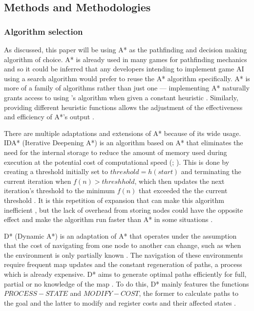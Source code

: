 \documentclass[11pt, a4paper]{article}
\begin{document}
\subsection{Methods and Methodologies}
\label{subsec:methodsAndMethodologies}

\subsubsection{Algorithm selection}
\label{subsubsec:algorithmSelection}

As discussed, this paper will be using A* as the pathfinding and decision making algorithm of choice. A* is already used in many games for pathfinding mechanics \parencite[197]{millington2019ai} and so it could be inferred that any developers intending to implement game AI using a search algorithm would prefer to reuse the A* algorithm specifically. A* is more of a family of algorithms rather than just one \parencite[107]{hart1968formal} --- implementing A* naturally grants access to using \citeauthor{dijkstra1959note}'s algorithm \parencite*{dijkstra1959note} when given a constant heuristic \parencite[10]{lester2005pathfinding}. Similarly, providing different heuristic functions allows the adjustment of the effectiveness and efficiency of A*'s output \parencite[107]{hart1968formal}.

There are multiple adaptations and extensions of A* because of its wide usage. IDA* (Iterative Deepening A*) is an algorithm based on A* that eliminates the need for the internal storage \parencite[36]{korf1985depth} to reduce the amount of memory used during execution at the potential cost of computational speed (\cite[2]{botea2004near}; \cite[44]{yap2002grid}). This is done by creating a threshold initially set to $threshold = h(start)$ and terminating the current iteration when $f(n) > threshhold$, which then updates the next iteration's threshold to the minimum $f(n)$ that exceeded the the current threshold \parencite[103]{korf1985depth}. It is this repetition of expansion that can make this algorithm inefficient \parencite[46]{yap2002grid}, but the lack of overhead from storing nodes could have the opposite effect and make the algorithm run faster than A* in some situations \parencite[106]{korf1985depth}.

D* (Dynamic A*) is an adaptation of A* that operates under the assumption that the cost of navigating from one node to another can change, such as when the environment is only partially known \parencite[1-2]{stentz1997optimal}. The navigation of these environments require frequent map updates and the constant regeneration of paths, a process which is already expensive. D* aims to generate optimal paths efficiently for full, partial or no knowledge of the map \parencite[2]{stentz1997optimal}. To do this, D* mainly features the functions $PROCESS - STATE$ and $MODIFY - COST$, the former to calculate paths to the goal and the latter to modify and register costs and their affected states \parencite[3]{stentz1997optimal}.
\end{document}
